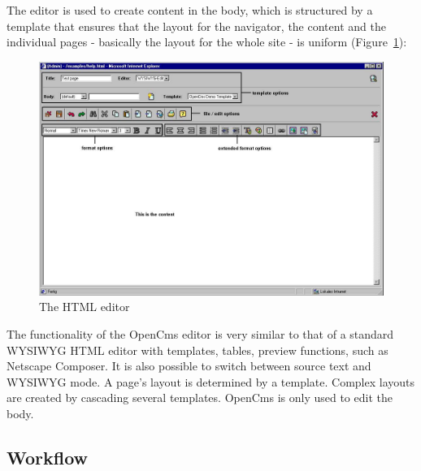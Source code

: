 The editor is used to create content in the body, which is
structured by a template that ensures that the layout for the
navigator, the content and the individual pages - basically the
layout for the whole site - is uniform
(Figure~\ref{thehtmleditor}):

\begin{figure}[hbt]
\begin{center}
\includegraphics[width=\sgw]
                   {pics/usermanual/theHtmlEditor}
\caption[The HTML editor]
           {The HTML editor}
\label{thehtmleditor}
\end{center}
\end{figure}

The functionality of the OpenCms editor is very similar to that of
a standard WYSIWYG HTML editor with templates, tables, preview
functions, such as Netscape Composer. It is also possible to
switch between source text and WYSIWYG mode. A page's layout is
determined by a template. Complex layouts are created by cascading
several templates. OpenCms is only used to edit the body.

\subsection{Workflow}

